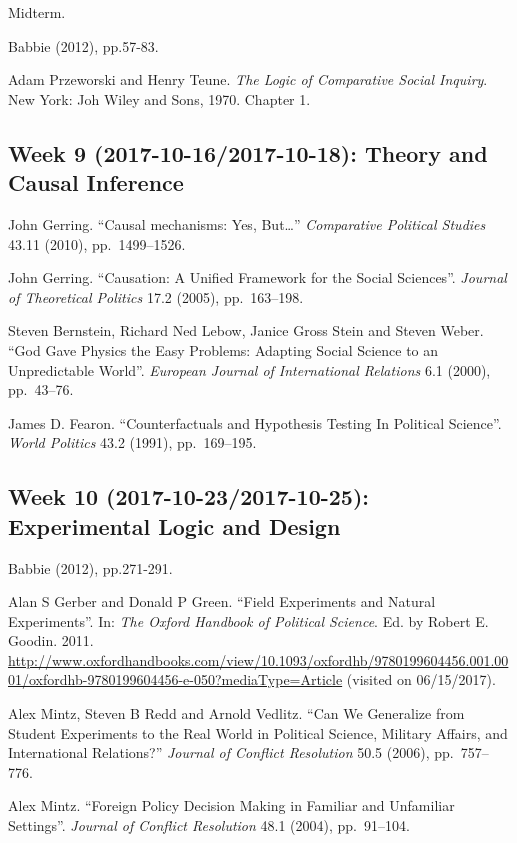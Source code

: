 \documentclass[11pt,]{article}
\theoremstyle{definition}
\theoremstyle{definition}
\theoremstyle{remark}
\begin{document}
Midterm.

Babbie (2012), pp.57-83.

Adam Przeworski and Henry Teune.
\emph{The Logic of Comparative Social Inquiry}. New York: Joh Wiley and
Sons, 1970. Chapter 1.

\subsection{Week 9 (2017-10-16/2017-10-18): Theory and Causal
Inference}\label{week-9-2017-10-162017-10-18-theory-and-causal-inference}

John Gerring. ``Causal mechanisms: Yes, But\ldots{}''
\emph{Comparative Political Studies} 43.11 (2010), pp.~1499--1526.

John Gerring. ``Causation: A Unified Framework for the Social
Sciences''. \emph{Journal of Theoretical Politics} 17.2 (2005),
pp.~163--198.

Steven Bernstein, Richard Ned Lebow, Janice Gross Stein and Steven
Weber. ``God Gave Physics the Easy Problems: Adapting Social Science to
an Unpredictable World''.
\emph{European Journal of International Relations} 6.1 (2000),
pp.~43--76.

James D. Fearon. ``Counterfactuals and Hypothesis Testing In Political
Science''. \emph{World Politics} 43.2 (1991), pp.~169--195.

\subsection{Week 10 (2017-10-23/2017-10-25): Experimental Logic and
Design}\label{week-10-2017-10-232017-10-25-experimental-logic-and-design}

Babbie (2012), pp.271-291.

Alan S Gerber and Donald P Green. ``Field Experiments and Natural
Experiments''. In: \emph{The Oxford Handbook of Political Science}. Ed.
by Robert E. Goodin. 2011.
\url{http://www.oxfordhandbooks.com/view/10.1093/oxfordhb/9780199604456.001.0001/oxfordhb-9780199604456-e-050?mediaType=Article}
(visited on 06/15/2017).

Alex Mintz, Steven B Redd and Arnold Vedlitz. ``Can We Generalize from
Student Experiments to the Real World in Political Science, Military
Affairs, and International Relations?''
\emph{Journal of Conflict Resolution} 50.5 (2006), pp.~757--776.

Alex Mintz. ``Foreign Policy Decision Making in Familiar and Unfamiliar
Settings''. \emph{Journal of Conflict Resolution} 48.1 (2004),
pp.~91--104.
\end{document}
